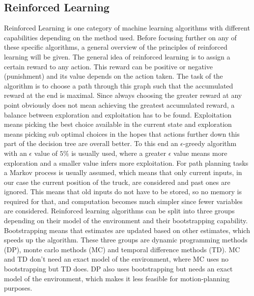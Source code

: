 \subsection{Reinforced Learning}
\label{sec:reinforced_learning}

Reinforced Learning is one category of machine learning algorithms with different capabilities depending on the method used. Before focusing further on any of these specific algorithms, a general overview of the principles of reinforced learning will be given. The general idea of reinforced learning is to assign a certain reward to any action. This reward can be positive or negative (punishment) and its value depends on the action taken. The task of the algorithm is to choose a path through this graph such that the accumulated reward at the end is maximal. Since always choosing the greater reward at any point obviously does not mean achieving the greatest accumulated reward, a balance between exploration and exploitation has to be found. Exploitation means picking the best choice available in the current state and exploration means picking sub optimal choices in the hopes that actions further down this part of the decision tree are overall better. To this end an $\epsilon$-greedy algorithm with an $\epsilon$ value of $5\%$ is usually used, where a greater $\epsilon$ value means more exploration and a smaller value infers more exploitation. For path planning tasks a Markov process is usually assumed, which means that only current inputs, in our case the current position of the truck, are considered and past ones are ignored. This means that old inputs do not have to be stored, so no memory is required for that, and computation becomes much simpler since fewer variables are considered. Reinforced learning algorithms can be split into three groups depending on their model of the environment and their bootstrapping capability. Bootstrapping means that estimates are updated based on other estimates, which speeds up the algorithm. These three groups are dynamic programming methods (DP), monte carlo methods (MC) and temporal difference methods (TD). MC and TD don't need an exact model of the environment, where MC uses no bootstrapping but TD does. DP also uses bootstrapping but needs an exact model of the environment, which makes it less feasible for motion-planning purposes.
